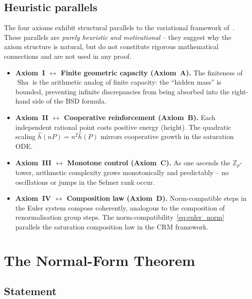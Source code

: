 \documentclass[aps,prd,twocolumn,superscriptaddress,nofootinbib]{revtex4-2}
\theoremstyle{definition}
\theoremstyle{remark}
\DeclareMathOperator{\Sha}{Sha}
\begin{document}
\subsection{Heuristic parallels}
\label{sec:heuristic}

The four axioms exhibit structural parallels to the variational framework of~\cite{FST-Unified2026}. These parallels are \textit{purely heuristic and motivational} -- they suggest why the axiom structure is natural, but do not constitute rigorous mathematical connections and are not used in any proof.

\begin{itemize}
\item \textbf{Axiom~I $\leftrightarrow$ Finite geometric capacity (Axiom~A).} The finiteness of $\Sha$ is the arithmetic analog of finite capacity: the ``hidden mass'' is bounded, preventing infinite discrepancies from being absorbed into the right-hand side of the BSD formula.

\item \textbf{Axiom~II $\leftrightarrow$ Cooperative reinforcement (Axiom~B).} Each independent rational point costs positive energy (height). The quadratic scaling $\hat{h}(nP) = n^2 \hat{h}(P)$ mirrors cooperative growth in the saturation ODE.

\item \textbf{Axiom~III $\leftrightarrow$ Monotone control (Axiom~C).} As one ascends the $\mathbb{Z}_p$-tower, arithmetic complexity grows monotonically and predictably -- no oscillations or jumps in the Selmer rank occur.

\item \textbf{Axiom~IV $\leftrightarrow$ Composition law (Axiom~D).} Norm-compatible steps in the Euler system compose coherently, analogous to the composition of renormalisation group steps. The norm-compatibility~\eqref{eq:euler_norm} parallels the saturation composition law in the CRM framework.
\end{itemize}


\section{The Normal-Form Theorem}
\label{sec:normal_form}

\subsection{Statement}
\end{document}
